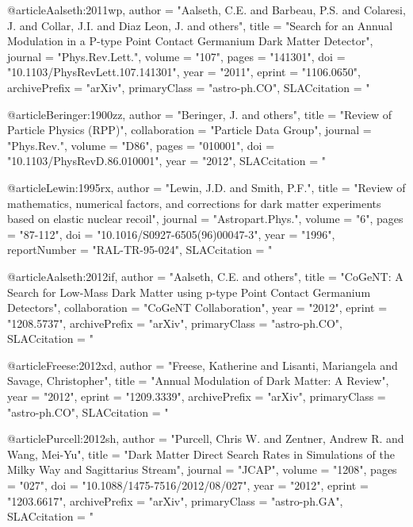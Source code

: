 @article{Aalseth:2011wp,
    author         = "Aalseth, C.E. and Barbeau, P.S. and Colaresi, J. and
    Collar, J.I. and Diaz Leon, J. and others",
    title          = "{Search for an Annual Modulation in a P-type Point
    Contact Germanium Dark Matter Detector}",
    journal        = "Phys.Rev.Lett.",
    volume         = "107",
    pages          = "141301",
    doi            = "10.1103/PhysRevLett.107.141301",
    year           = "2011",
    eprint         = "1106.0650",
    archivePrefix  = "arXiv",
    primaryClass   = "astro-ph.CO",
    SLACcitation   = "%
}

@article{Beringer:1900zz,
    author         = "Beringer, J. and others",
    title          = "{Review of Particle Physics (RPP)}",
    collaboration  = "Particle Data Group",
    journal        = "Phys.Rev.",
    volume         = "D86",
    pages          = "010001",
    doi            = "10.1103/PhysRevD.86.010001",
    year           = "2012",
    SLACcitation   = "%
}

@article{Lewin:1995rx,
    author         = "Lewin, J.D. and Smith, P.F.",
    title          = "{Review of mathematics, numerical factors, and
    corrections for dark matter experiments based on elastic
    nuclear recoil}",
    journal        = "Astropart.Phys.",
    volume         = "6",
    pages          = "87-112",
    doi            = "10.1016/S0927-6505(96)00047-3",
    year           = "1996",
    reportNumber   = "RAL-TR-95-024",
    SLACcitation   = "%
}

@article{Aalseth:2012if,
    author         = "Aalseth, C.E. and others",
    title          = "{CoGeNT: A Search for Low-Mass Dark Matter using p-type
    Point Contact Germanium Detectors}",
    collaboration  = "CoGeNT Collaboration",
    year           = "2012",
    eprint         = "1208.5737",
    archivePrefix  = "arXiv",
    primaryClass   = "astro-ph.CO",
    SLACcitation   = "%
}


@article{Freese:2012xd,
    author         = "Freese, Katherine and Lisanti, Mariangela and Savage,
    Christopher",
    title          = "{Annual Modulation of Dark Matter: A Review}",
    year           = "2012",
    eprint         = "1209.3339",
    archivePrefix  = "arXiv",
    primaryClass   = "astro-ph.CO",
    SLACcitation   = "%
}

@article{Purcell:2012sh,
    author         = "Purcell, Chris W. and Zentner, Andrew R. and Wang,
    Mei-Yu",
    title          = "{Dark Matter Direct Search Rates in Simulations of the
    Milky Way and Sagittarius Stream}",
    journal        = "JCAP",
    volume         = "1208",
    pages          = "027",
    doi            = "10.1088/1475-7516/2012/08/027",
    year           = "2012",
    eprint         = "1203.6617",
    archivePrefix  = "arXiv",
    primaryClass   = "astro-ph.GA",
    SLACcitation   = "%
}

